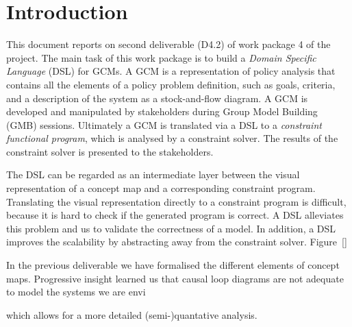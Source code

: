 \section{Introduction}\label{introduction}





This document reports on second deliverable (D4.2) of work package 4 of the
\grace project. The main task of this work package is to build a \emph{Domain
Specific Language} (DSL) for \acp{GCM}. A \ac{GCM} is a representation of policy
analysis that contains all the elements of a policy problem definition, such as
goals, criteria, and a description of the system as a stock-and-flow diagram. A
GCM is developed and manipulated by stakeholders during Group Model Building
(GMB) sessions. Ultimately a GCM is translated via a DSL to a \emph{constraint
functional program}, which is analysed by a constraint solver. The results of
the constraint solver is presented to the stakeholders.

The DSL can be regarded as an intermediate layer between the visual
representation of a \grace concept map and a corresponding constraint program.
Translating the visual representation directly to a constraint program is
difficult, because it is hard to check if the generated program is correct. A
DSL alleviates this problem and us to validate the correctness of a model. In
addition, a DSL improves the scalability by abstracting away from the constraint
solver. Figure~\ref{} 




In the previous deliverable we have formalised the different elements of \grace
concept maps. Progressive insight learned us that causal loop diagrams are not
adequate to model the systems we are envi 

which allows for a more detailed (semi-)quantative analysis.








